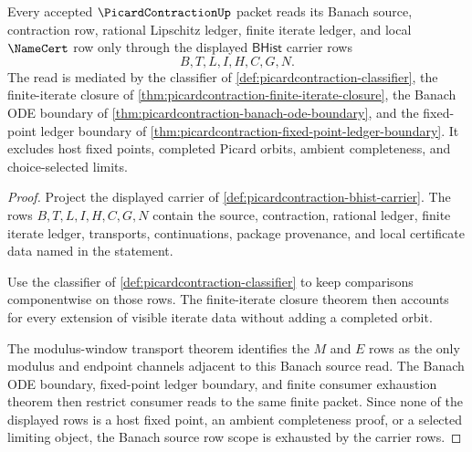 \begin{theorem}
\label{thm:picardcontraction-banach-source-row-scope}
Every accepted $\PicardContractionUp$ packet reads its Banach source, contraction row, rational Lipschitz ledger, finite iterate ledger, and local $\NameCert$ row only through the displayed $\mathsf{BHist}$ carrier rows
$$
B,T,L,I,H,C,G,N.
$$
The read is mediated by the classifier of \autoref{def:picardcontraction-classifier}, the finite-iterate closure of \autoref{thm:picardcontraction-finite-iterate-closure}, the Banach ODE boundary of \autoref{thm:picardcontraction-banach-ode-boundary}, and the fixed-point ledger boundary of \autoref{thm:picardcontraction-fixed-point-ledger-boundary}. It excludes host fixed points, completed Picard orbits, ambient completeness, and choice-selected limits.
\end{theorem}
\begin{proof}
Project the displayed carrier of \autoref{def:picardcontraction-bhist-carrier}. The rows $B,T,L,I,H,C,G,N$ contain the source, contraction, rational ledger, finite iterate ledger, transports, continuations, package provenance, and local certificate data named in the statement.

Use the classifier of \autoref{def:picardcontraction-classifier} to keep comparisons componentwise on those rows. The finite-iterate closure theorem then accounts for every extension of visible iterate data without adding a completed orbit.

The modulus-window transport theorem identifies the $M$ and $E$ rows as the only modulus and endpoint channels adjacent to this Banach source read. The Banach ODE boundary, fixed-point ledger boundary, and finite consumer exhaustion theorem then restrict consumer reads to the same finite packet. Since none of the displayed rows is a host fixed point, an ambient completeness proof, or a selected limiting object, the Banach source row scope is exhausted by the carrier rows.
\end{proof}

